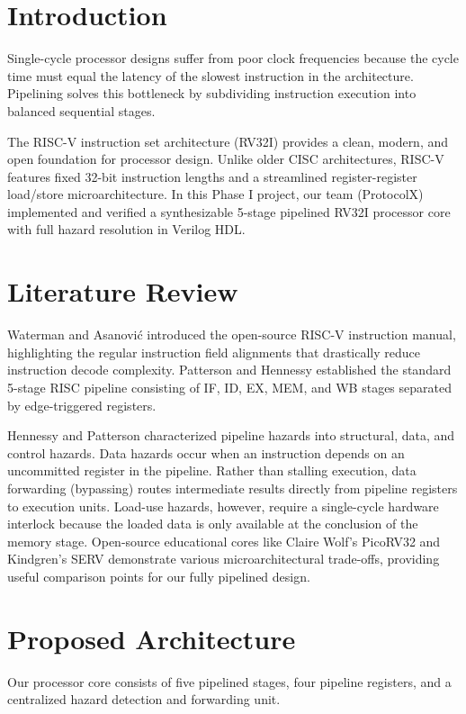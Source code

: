 \documentclass[conference]{IEEEtran}
\begin{document}
\section{Introduction}
Single-cycle processor designs suffer from poor clock frequencies because the cycle time must equal the latency of the slowest instruction in the architecture. Pipelining solves this bottleneck by subdividing instruction execution into balanced sequential stages. 

The RISC-V instruction set architecture (RV32I) provides a clean, modern, and open foundation for processor design. Unlike older CISC architectures, RISC-V features fixed 32-bit instruction lengths and a streamlined register-register load/store microarchitecture. In this Phase I project, our team (ProtocolX) implemented and verified a synthesizable 5-stage pipelined RV32I processor core with full hazard resolution in Verilog HDL.

\section{Literature Review}
Waterman and Asanovi\'c \cite{riscv_spec} introduced the open-source RISC-V instruction manual, highlighting the regular instruction field alignments that drastically reduce instruction decode complexity. Patterson and Hennessy \cite{patterson} established the standard 5-stage RISC pipeline consisting of IF, ID, EX, MEM, and WB stages separated by edge-triggered registers. 

Hennessy and Patterson \cite{hennessy} characterized pipeline hazards into structural, data, and control hazards. Data hazards occur when an instruction depends on an uncommitted register in the pipeline. Rather than stalling execution, data forwarding (bypassing) routes intermediate results directly from pipeline registers to execution units. Load-use hazards, however, require a single-cycle hardware interlock because the loaded data is only available at the conclusion of the memory stage. Open-source educational cores like Claire Wolf's PicoRV32 \cite{picorv32} and Kindgren's SERV \cite{serv} demonstrate various microarchitectural trade-offs, providing useful comparison points for our fully pipelined design.

\section{Proposed Architecture}
Our processor core consists of five pipelined stages, four pipeline registers, and a centralized hazard detection and forwarding unit.
\end{document}
